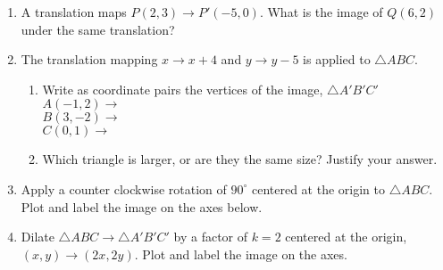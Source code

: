 \documentclass[12pt, twoside]{article}
\begin{document}
\begin{enumerate}[itemsep=0.5cm]
\item A translation maps $P(2,3) \rightarrow P'(-5,0)$. What is the image of $Q(6,2)$ under the same translation? \vspace{1cm}
      
\item The translation mapping $x \rightarrow x+4$ and $y \rightarrow y - 5$ is applied to $\triangle ABC$.
  \begin{enumerate}
    \item Write as coordinate pairs the vertices of the image, $\triangle A'B'C'$ \\[0.3cm]
    $A(-1,2) \rightarrow$ \\[0.7cm]
    $B(3,-2) \rightarrow$ \\[0.7cm]
    $C(0,1) \rightarrow$ \\[0.1cm]
    \item Which triangle is larger, or are they the same size? Justify your answer.
  \end{enumerate} \vspace{2cm}


\newpage
\item Apply a counter clockwise rotation of $90^\circ$ centered at the origin to $\triangle ABC$. Plot and label the image on the axes below.
  \begin{center}
  \end{center}

\item Dilate $\triangle ABC \rightarrow \triangle A'B'C'$ by a factor of $k=2$ centered at the origin, \\
$(x,y) \rightarrow (2x, 2y)$. Plot and label the image on the axes.
  \begin{center}
  \end{center}


\end{enumerate}
\end{document}
